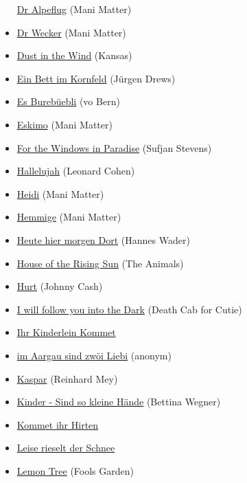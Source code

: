 \documentclass[
]{book}
\begin{document}
\begin{itemize}
  \protect\hyperlink{mundart-und-deutsch-dr-alpeflug}{Dr Alpeflug} (Mani Matter)
\item
  \protect\hyperlink{mundart-und-deutsch-dr-wecker}{Dr Wecker} (Mani Matter)
\item
  \protect\hyperlink{classics-dust-in-the-wind}{Dust in the Wind} (Kansas)
\item
  \protect\hyperlink{classics-ein-bett-im-kornfeld}{Ein Bett im Kornfeld} (Jürgen Drews)
\item
  \protect\hyperlink{volsklieder-es-burebuebli}{Es Burebüebli} (vo Bern)
\item
  \protect\hyperlink{mundart-und-deutsch-eskimo}{Eskimo} (Mani Matter)
\item
  \protect\hyperlink{selected-songs-windows-in-paradise}{For the Windows in Paradise} (Sufjan Stevens)
\item
  \protect\hyperlink{selected-songs-hallelujah}{Hallelujah} (Leonard Cohen)
\item
  \protect\hyperlink{mundart-und-deutsch-heidi}{Heidi} (Mani Matter)
\item
  \protect\hyperlink{mundart-und-deutsch-hemmige}{Hemmige} (Mani Matter)
\item
  \protect\hyperlink{mundart-und-deutsch-heute-hier-morgen-dort}{Heute hier morgen Dort} (Hannes Wader)
\item
  \protect\hyperlink{classics-house-of-the-rising-sun}{House of the Rising Sun} (The Animals)
\item
  \protect\hyperlink{classics-hurt}{Hurt} (Johnny Cash)
\item
  \protect\hyperlink{selected-songs-i-will-follow-you-into-the-dark}{I will follow you into the Dark} (Death Cab for Cutie)
\item
  \protect\hyperlink{weihnachten-ihr-kinderleit-kommet}{Ihr Kinderlein Kommet}
\item
  \protect\hyperlink{volsklieder-im-aargau}{im Aargau sind zwöi Liebi} (anonym)
\item
  \protect\hyperlink{mundart-und-deutsch-kaspar}{Kaspar} (Reinhard Mey)
\item
  \protect\hyperlink{mundart-und-deutsch-so-kleine-haende}{Kinder - Sind so kleine Hände} (Bettina Wegner)
\item
  \protect\hyperlink{weihnachten-kommet-ihr-hirten}{Kommet ihr Hirten}
\item
  \protect\hyperlink{weihnachten-leise-rieselt-der-schnee}{Leise rieselt der Schnee}
\item
  \protect\hyperlink{classics-lemon-tree}{Lemon Tree} (Fools Garden)

\end{itemize}
\end{document}
